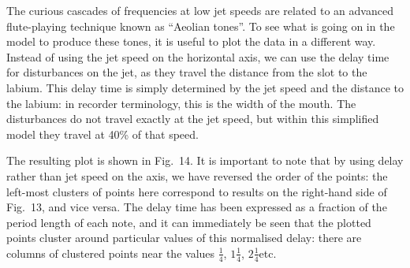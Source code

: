 
  The curious cascades of frequencies at low jet speeds are related to an 
  advanced flute-playing technique known as “Aeolian tones”. To see what is 
  going on in the model to produce these tones, it is useful to plot the data 
  in a different way. Instead of using the jet speed on the horizontal axis, we 
  can use the delay time for disturbances on the jet, as they travel the 
  distance from the slot to the labium. This delay time is simply determined by 
  the jet speed and the distance to the labium: in recorder terminology, this 
  is the width of the mouth. The disturbances do not travel exactly at the jet 
  speed, but within this simplified model they travel at 40\% of that speed. 

  The resulting plot is shown in Fig.\ 14. It is important to note that by 
  using delay rather than jet speed on the axis, we have reversed the order of 
  the points: the left-most clusters of points here correspond to results on 
  the right-hand side of Fig.\ 13, and vice versa. The delay time has been 
  expressed as a fraction of the period length of each note, and it can 
  immediately be seen that the plotted points cluster around particular values 
  of this normalised delay: there are columns of clustered points near the 
  values $\frac{1}{4}$, $1 \frac{1}{4}$, $2 \frac{1}{4}$etc. 


